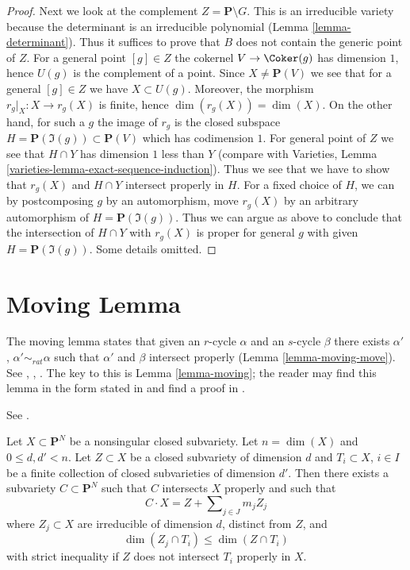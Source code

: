 \begin{proof}
\medskip\noindent
Next we look at the complement $Z = \mathbf{P} \setminus G$.
This is an irreducible variety because the determinant is an
irreducible polynomial (Lemma \ref{lemma-determinant}).
Thus it suffices to prove that $B$ does not contain the
generic point of $Z$. For a general point $[g] \in Z$
the cokernel $V \to \Coker(g)$ has dimension $1$, hence
$U(g)$ is the complement of a point. Since $X \not = \mathbf{P}(V)$
we see that for a general $[g] \in Z$ we have $X \subset U(g)$.
Moreover, the morphism $r_g|_X : X \to r_g(X)$ is finite, hence
$\dim(r_g(X)) = \dim(X)$.
On the other hand, for such a $g$ the image of $r_g$ is the
closed subspace $H = \mathbf{P}(\Im(g)) \subset \mathbf{P}(V)$
which has codimension $1$.
For general point of $Z$ we see that $H \cap Y$ has dimension $1$
less than $Y$ (compare with
Varieties, Lemma \ref{varieties-lemma-exact-sequence-induction}).
Thus we see that we have to show that $r_g(X)$ and $H \cap Y$
intersect properly in $H$. For a fixed choice of $H$, we can
by postcomposing $g$ by an automorphism, move $r_g(X)$ by
an arbitrary automorphism of $H = \mathbf{P}(\Im(g))$.
Thus we can argue as above to conclude that the intersection
of $H \cap Y$ with $r_g(X)$ is proper for general $g$ with given
$H = \mathbf{P}(\Im(g))$. Some details omitted.
\end{proof}







\section{Moving Lemma}
\label{section-moving-lemma}

\noindent
The moving lemma states that given an $r$-cycle $\alpha$ and an $s$-cycle
$\beta$ there exists $\alpha'$, $\alpha' \sim_{rat} \alpha$ such that
$\alpha'$ and $\beta$ intersect properly (Lemma \ref{lemma-moving-move}).
See \cite{Samuel}, \cite{ChevalleyI}, \cite{ChevalleyII}.
The key to this is Lemma \ref{lemma-moving}; the reader may find
this lemma in the form stated in
\cite[Example 11.4.1]{F} and find a proof in \cite{Roberts}.

\begin{lemma}
\label{lemma-moving}
\begin{reference}
See \cite{Roberts}.
\end{reference}
Let $X \subset \mathbf{P}^N$ be a nonsingular closed subvariety.
Let $n = \dim(X)$ and $0 \leq d, d' < n$. Let $Z \subset X$ be a closed
subvariety of dimension $d$ and $T_i \subset X$, $i \in I$ be a finite
collection of closed subvarieties of dimension $d'$. Then there exists
a subvariety $C \subset \mathbf{P}^N$ such that $C$ intersects $X$
properly and such that
$$
C \cdot X = Z + \sum\nolimits_{j \in J} m_j Z_j
$$
where $Z_j \subset X$ are irreducible of dimension $d$, distinct from $Z$, and
$$
\dim(Z_j \cap T_i) \leq \dim(Z \cap T_i)
$$
with strict inequality if $Z$ does not intersect $T_i$ properly in $X$.
\end{lemma}


